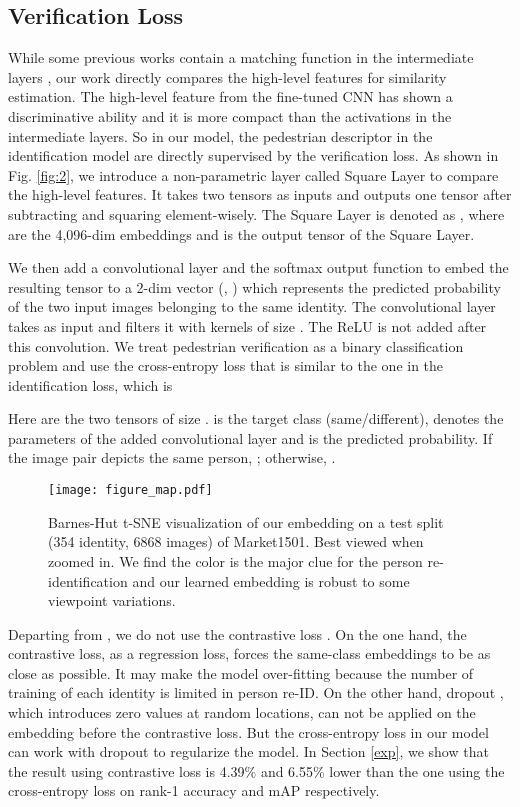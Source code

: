 \documentclass[journal]{IEEEtran}
\begin{document}
\subsection{Verification Loss}
While some previous works contain a matching function in the intermediate layers \cite{li2014deepreid,varior2016gated,ahmed2015improved}, our work directly compares the high-level features  for similarity estimation. The high-level feature from the fine-tuned CNN has shown a discriminative ability \cite{zheng2016person,zheng2016mars} and it is more compact than the activations in the intermediate layers. So in our model, the pedestrian descriptor  in the identification model are directly supervised by the verification loss. As shown in Fig. \ref{fig:2}, we introduce a non-parametric layer called Square Layer to compare the high-level features. It takes two tensors as inputs and outputs one tensor after subtracting and squaring element-wisely. The Square Layer is denoted as , where  are the 4,096-dim embeddings and  is the output tensor of the Square Layer. 

We then add a convolutional layer and the softmax output function to embed the resulting tensor  to a 2-dim vector (, ) which represents the predicted probability of the two input images belonging to the same identity.  The convolutional layer takes  as input and filters it with  kernels of size . The ReLU is not added after this convolution. We treat pedestrian verification as a binary classification problem and use the cross-entropy loss that is similar to the one in the identification loss, which is

Here  are the two tensors of size .  is the target class (same/different),  denotes the parameters of the added convolutional layer and  is the predicted probability. If the image pair depicts the same person, ; otherwise, . 

\begin{figure*}[t]
\begin{center}
\texttt{[image: figure\_map.pdf]}
\end{center}
   \caption{Barnes-Hut t-SNE visualization \cite{van2014accelerating} of our embedding on a test split (354 identity, 6868 images) of Market1501. Best viewed  when zoomed in. We find the color is the major clue for the person re-identification and our learned embedding is robust to some viewpoint variations.}
\label{fig:map}
\label{fig:onecol}
\end{figure*}

Departing from \cite{sun2014deep}, we do not use the contrastive loss \cite{hadsell2006dimensionality}. On the one hand, the contrastive loss, as a regression loss, forces the same-class embeddings to be as close as possible. It may make the model over-fitting because the number of training of each identity is limited in person re-ID. On the other hand, dropout \cite{srivastava2014dropout}, which introduces zero values at random locations, can not be applied on the embedding before the contrastive loss. But the cross-entropy loss in our model can work with dropout to regularize the model. In Section \ref{exp}, we show that the result using contrastive loss is 4.39\% and 6.55\% lower than the one using the cross-entropy loss on rank-1 accuracy and mAP respectively.
\end{document}

